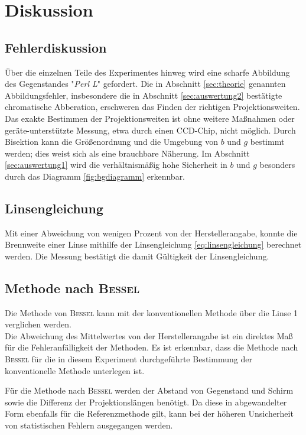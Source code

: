 \section{Diskussion}
\label{sec:Diskussion}
\subsection{Fehlerdiskussion}
Über die einzelnen Teile des Experimentes hinweg wird eine scharfe Abbildung des Gegenstandes "\emph{Perl L}" gefordert.
Die in Abschnitt \ref{sec:theorie} genannten Abbildungsfehler, 
insbesondere die in Abschnitt \ref{sec:auswertung2} bestätigte chromatische Abberation, 
erschweren das Finden der richtigen Projektionsweiten. 
Das exakte Bestimmen der Projektionsweiten ist ohne weitere Maßnahmen oder geräte-unterstützte Messung, etwa durch einen CCD-Chip, nicht möglich.
Durch Bisektion kann die Größenordnung und die Umgebung von $b$ und $g$ bestimmt werden; dies weist sich als eine brauchbare Näherung.
Im Abschnitt \ref{sec:auswertung1} wird die verhältnismäßig hohe Sicherheit in $b$ und $g$ besonders durch das Diagramm \ref{fig:bgdiagramm} erkennbar.

\subsection{Linsengleichung}
Mit einer Abweichung von wenigen Prozent von der Herstellerangabe, konnte die Brennweite einer Linse mithilfe der Linsengleichung \eqref{eq:linsengleichung} berechnet werden.
Die Messung bestätigt die damit Gültigkeit der Linsengleichung.

\subsection{Methode nach \texorpdfstring{\textsc{Bessel}}{Bessel}}
Die Methode von \texorpdfstring{\textsc{Bessel}}{Bessel} kann mit der konventionellen Methode über die Linse 1 verglichen werden.\\
Die Abweichung des Mittelwertes von der Herstellerangabe ist ein direktes Maß für die Fehleranfälligkeit der Methoden. 
Es ist erkennbar, dass die Methode nach \texorpdfstring{\textsc{Bessel}}{Bessel} für die in diesem Experiment durchgeführte Bestimmung der konventionelle Methode unterlegen ist.

Für die Methode nach \texorpdfstring{\textsc{Bessel}}{Bessel} werden der Abstand von Gegenstand und Schirm sowie die Differenz der Projektionslängen benötigt. 
Da diese in abgewandelter Form ebenfalls für die Referenzmethode gilt, kann bei der höheren Unsicherheit von statistischen Fehlern ausgegangen werden.

